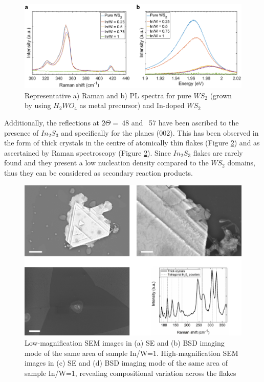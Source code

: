 \begin{figure}[!h]
	\begin{center}
		\includegraphics[scale=0.5]{In/RamanPL.png}
		\caption{Representative a) Raman and b) PL spectra for pure $WS_2$ (grown by using $H_2WO_4$ as metal precursor) and In-doped $WS_2$}
		\label{fig:InRamanPL}
	\end{center}
\end{figure}

Additionally, the reflections at $2\Theta =~48$ and ~57 have been ascribed to the presence of $In_2S_3$ \cite{Hahn1949} and specifically for the planes (002). This has been observed in the form of thick crystals in the centre of atomically thin flakes (Figure \ref{fig:InSEMCentre}) and as ascertained by Raman spectroscopy (Figure \ref{fig:InSEMCentre}). Since $In_2S_3$ flakes are rarely found and they present a low nucleation density compared to the $WS_2$ domains, thus they can be considered as secondary reaction products.

\begin{figure}[!h]
	\begin{center}
		\includegraphics[scale=0.5]{In/SEMCentre.png}
		\caption{Low-magnification SEM images in (a) SE and (b) BSD imaging mode of the same area of sample In/W=1. High-magnification SEM images in (c) SE and (d) BSD imaging mode of the same area of sample In/W=1, revealing compositional variation across the flakes}
		\label{fig:InSEMCentre}
	\end{center}
\end{figure}

